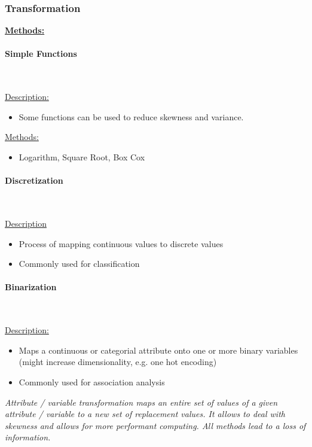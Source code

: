 \documentclass[12pt, a4paper, oneside, justified]{article}
\begin{document}
\subsubsection{Transformation}

\underline{\textbf{Methods:}}

\paragraph*{Simple Functions}~{}

\underline{Description:}
\begin{itemize}
    \item Some functions can be used to reduce skewness and variance.
\end{itemize}

\underline{Methods:}
\begin{itemize}
    \item Logarithm, Square Root, Box Cox
\end{itemize}

\paragraph*{Discretization}~{}

\underline{Description}
\begin{itemize}
    \item Process of mapping continuous values to discrete values
    \item Commonly used for classification
\end{itemize}

\paragraph*{Binarization}~{}

\underline{Description:}
\begin{itemize}
    \item Maps a continuous or categorial attribute onto one or more binary variables (might increase dimensionality, e.g. one hot encoding)
    \item Commonly used for association analysis
\end{itemize}

\textit{Attribute / variable transformation maps an entire set of values of a given attribute / variable to a new set of replacement values. It allows to deal with skewness and allows for more performant computing. All methods lead to a loss of information.}
\end{document}
